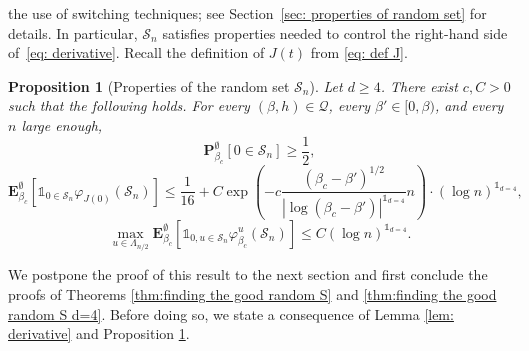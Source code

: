 \documentclass[11pt,a4paper]{article}
\numberwithin{equation}{section}
\theoremstyle{plain}
\newtheorem{Prop}[Thm]{Proposition}
\theoremstyle{definition}
\begin{document}
the use of switching techniques; see Section~\ref{sec: properties of 
random set} for details. In particular, $\mathcal{S}_n$ satisfies properties needed to control the right-hand side of~\eqref{eq: derivative}. Recall the definition of $J(t)$ from \eqref{eq: def J}. 
\begin{Prop}[Properties of the random set $\mathcal S_n$]\label{prop:properties of the random set} Let $d\geq 4$. There exist $c,C>0$ such that the following holds.  For every $(\beta,h)\in \mathcal Q$, every $\beta'\in [0,\beta)$, and every $n$ large enough,
\begin{equation}\label{eq:prop 1}
	\mathbf P_{\beta_c}^\emptyset[0\in \mathcal S_n]\geq \frac{1}{2},
\end{equation}
\begin{equation}\label{eq:prop 2}
	\mathbf E_{\beta_c}^{\emptyset}[\mathds{1}_{0\in \mathcal S_n}\varphi_{J(0)}(\mathcal S_n)]\leq \frac{1}{16}+ C\exp\left(-c\frac{(\beta_c-\beta')^{1/2}}{|\log (\beta_c-\beta')|^{\mathds{1}_{d=4}}} n\right)\cdot (\log n)^{\mathds{1}_{d=4}},
\end{equation}
\begin{equation}\label{eq:prop 3}
	\max_{u\in \Lambda_{n/2}}\mathbf E_{\beta_c}^\emptyset[\mathds{1}_{0,u\in \mathcal S_n}\varphi_{\beta_c}^u(\mathcal S_n)]\leq C(\log n)^{\mathds{1}_{d=4}}.
\end{equation}
\end{Prop}

We postpone the proof of this result to the next section and first conclude the proofs of Theorems \ref{thm:finding the good random S} and \ref{thm:finding the good random S d=4}. Before doing so, we state a consequence of Lemma \ref{lem: derivative} and Proposition \ref{prop:properties of the random set}.
\end{document}
